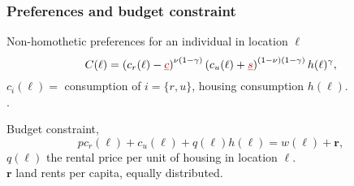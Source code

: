 \documentclass[aspectratio=169]{beamer}
\begin{document}
\begin{v75mins}
\begin{frame}[label=preference]
\frametitle{Preferences and budget constraint}
\begin{midi}
\item Non-homothetic preferences for an individual in location $\ell$
\begin{equation*}
C(\ell)=\left( c_r(\ell)-\re{\underline{c}}\right)^{\nu(1-\gamma)} \left(c_u(\ell) + \re{\underline{s}}\right) ^{(1-\nu)(1-\gamma)}h(\ell)^\gamma,
\end{equation*}
$c_i(\ell)=$ consumption of $i=\{r,u\}$, housing consumption $h(\ell)$.\\
.\\
\item Budget constraint,
\begin{equation*}
pc_r(\ell)+c_u(\ell)+q(\ell)h(\ell)=w(\ell)+\mathbf{r},
\end{equation*}
$q(\ell)$ the rental price per unit of housing in location $\ell$.\\
$\mathbf{r}$ land rents per capita, equally distributed.
\end{midi}
\end{frame}
\end{v75mins}


\end{document}
